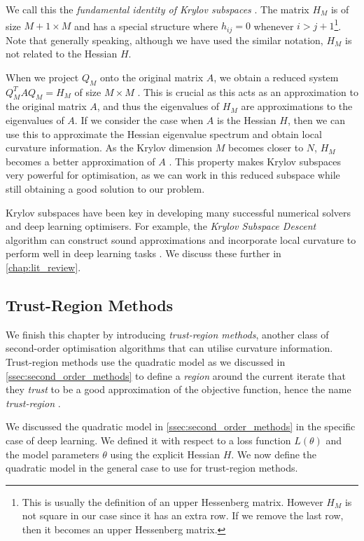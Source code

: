 We call this the \textit{fundamental identity of Krylov subspaces} \citep{krylov_book}. The matrix $H_M$ is of size $M+1 \times M$ and has a special structure where $h_{ij} = 0$ whenever $i > j + 1$\footnote{This is usually the definition of an upper Hessenberg matrix. However $H_M$ is not square in our case since it has an extra row. If we remove the last row, then it becomes an upper Hessenberg matrix.}. Note that generally speaking, although we have used the similar notation, $H_M$ is not related to the Hessian $H$.

When we project $Q_M$ onto the original matrix $A$, we obtain a reduced system $Q_M^T A Q_M = H_M$ of size $M \times M$ \citep{krylov_book}. This is crucial as this acts as an approximation to the original matrix $A$, and thus the eigenvalues of $H_M$ are approximations to the eigenvalues of $A$. If we consider the case when $A$ is the Hessian $H$, then we can use this to approximate the Hessian eigenvalue spectrum and obtain local curvature information. As the Krylov dimension $M$ becomes closer to $N$, $H_M$ becomes a better approximation of $A$ \citep{krylov_book}. This property makes Krylov subspaces very powerful for optimisation, as we can work in this reduced subspace while still obtaining a good solution to our problem.

Krylov subspaces have been key in developing many successful numerical solvers and deep learning optimisers. For example, the \textit{Krylov Subspace Descent} algorithm can construct sound approximations and incorporate local curvature to perform well in deep learning tasks \citep{vinyals2012krylov}. We discuss these further in \cref{chap:lit_review}.

\subsection{Trust-Region Methods}
\label{ssec:trust_region_methods}

We finish this chapter by introducing \textit{trust-region methods}, another class of second-order optimisation algorithms that can utilise curvature information. Trust-region methods use the quadratic model as we discussed in \cref{ssec:second_order_methods} to define a \textit{region} around the current iterate that they \textit{trust} to be a good approximation of the objective function, hence the name \textit{trust-region} \citep{NoceWrig06}. 

We discussed the quadratic model in \cref{ssec:second_order_methods} in the specific case of deep learning. We defined it with respect to a loss function $L(\theta)$ and the model parameters $\theta$ using the explicit Hessian $H$. We now define the quadratic model in the general case to use for trust-region methods.

